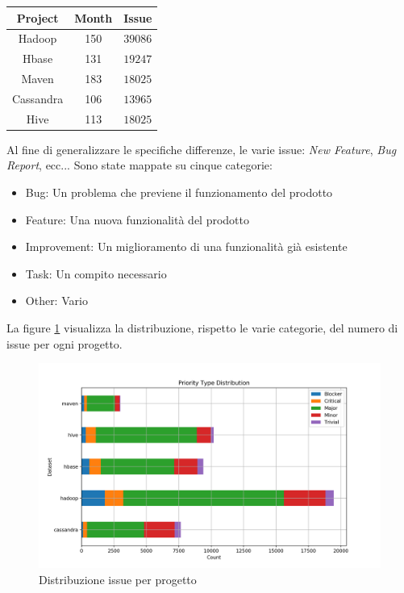 \documentclass[%
    corpo=12pt,
    twoside,
    oldstyle,
    autoretitolo,
    greek,
    evenboxes,
]{toptesi}
\begin{document}
\begin{center}
   \label{tab:seoss33_selected}
  \begin{tabular}{ |c|c|c| }
     \hline
     \textbf{Project} & \textbf{Month} & \textbf{Issue} \\
     \hline
     \hline
     Hadoop & 150 & $39086$ \\
     Hbase & 131 & $19247$ \\
     Maven & 183 & $18025$ \\
     Cassandra & 106 & $13965$ \\
     Hive & 113 & $18025$ \\
     \hline
  \end{tabular}
\end{center}

Al fine di generalizzare le specifiche differenze, le varie issue: \textit{New Feature}, \textit{Bug Report}, ecc... Sono state mappate su cinque categorie:
\begin{itemize}
  \item Bug: Un problema che previene il funzionamento del prodotto
  \item Feature: Una nuova funzionalità del prodotto
  \item Improvement: Un miglioramento di una funzionalità già esistente
  \item Task: Un compito necessario
  \item Other: Vario
\end{itemize}

La figure \ref{fig:prior} visualizza la distribuzione, rispetto le varie categorie, del numero di issue per ogni progetto.

\begin{figure}[!ht]
  \includegraphics[width=\linewidth]{figure/prior.png}
  \caption{Distribuzione issue per progetto}
  \label{fig:prior}
\end{figure}
\end{document}
